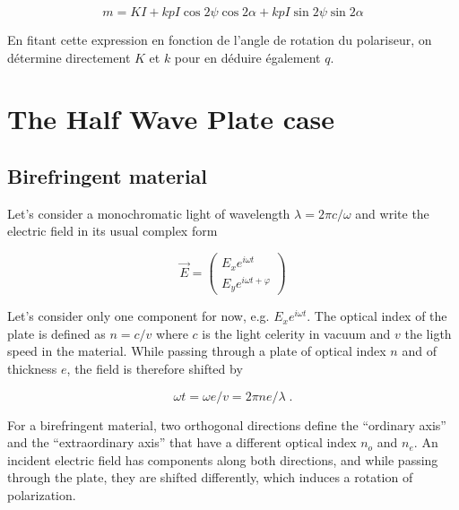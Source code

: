 \documentclass[a4paper,10pt]{article}
\begin{document}
\begin{equation}
m = KI + kpI\cos2\psi\cos2\alpha + kpI\sin2\psi\sin2\alpha
\end{equation}

En fitant cette expression en fonction de l'angle de rotation du polariseur, on
d\'etermine directement $K$ et $k$ pour en d\'eduire \'egalement $q$.



\section{The Half Wave Plate case}

\subsection{Birefringent material}

Let's consider a monochromatic light of wavelength $\lambda=2\pi c/\omega$ and write the
electric field in its usual complex form

\begin{equation}
\vec{E} = \left(\begin{array}{l}
E_x e^{i\omega t} \\
E_y e^{i\omega t + \varphi}
\end{array}\right)
\end{equation}

Let's consider only one component for now, e.g. $E_x e^{i\omega t}$. The optical
index of the plate is defined as $n=c/v$ where $c$ is the light celerity in
vacuum and $v$ the ligth speed in the material. While passing through a plate of
optical index $n$ and of thickness $e$, the field is therefore shifted by

\begin{equation}
\omega t = \omega e/v = 2\pi n e/\lambda\;.
\label{eq:shift}
\end{equation}

For a birefringent material, two orthogonal directions define the ``ordinary
axis'' and the ``extraordinary axis'' that have a different optical index $n_o$
and $n_e$. An incident electric field has components along both directions, and
while passing through the plate, they are shifted differently, which induces a
rotation of polarization.
\end{document}
